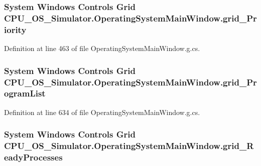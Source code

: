 \subsubsection[{grid\+\_\+\+Priority}]{\setlength{\rightskip}{0pt plus 5cm}System Windows Controls Grid C\+P\+U\+\_\+\+O\+S\+\_\+\+Simulator.\+Operating\+System\+Main\+Window.\+grid\+\_\+\+Priority\hspace{0.3cm}{\ttfamily [package]}}\label{class_c_p_u___o_s___simulator_1_1_operating_system_main_window_a0b2ac61c7430b46fa467986e7afd9448}


Definition at line 463 of file Operating\+System\+Main\+Window.\+g.\+cs.

\hypertarget{class_c_p_u___o_s___simulator_1_1_operating_system_main_window_a22160eecd007b7aedf48db6c64eb2da6}{}
\subsubsection[{grid\+\_\+\+Program\+List}]{\setlength{\rightskip}{0pt plus 5cm}System Windows Controls Grid C\+P\+U\+\_\+\+O\+S\+\_\+\+Simulator.\+Operating\+System\+Main\+Window.\+grid\+\_\+\+Program\+List\hspace{0.3cm}{\ttfamily [package]}}\label{class_c_p_u___o_s___simulator_1_1_operating_system_main_window_a22160eecd007b7aedf48db6c64eb2da6}


Definition at line 634 of file Operating\+System\+Main\+Window.\+g.\+cs.

\hypertarget{class_c_p_u___o_s___simulator_1_1_operating_system_main_window_a4dc7b1233f61261fad09e145e63563a3}{}
\subsubsection[{grid\+\_\+\+Ready\+Processes}]{\setlength{\rightskip}{0pt plus 5cm}System Windows Controls Grid C\+P\+U\+\_\+\+O\+S\+\_\+\+Simulator.\+Operating\+System\+Main\+Window.\+grid\+\_\+\+Ready\+Processes\hspace{0.3cm}{\ttfamily [package]}}\label{class_c_p_u___o_s___simulator_1_1_operating_system_main_window_a4dc7b1233f61261fad09e145e63563a3}


